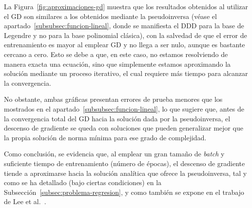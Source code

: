 La Figura~\ref{fig:aproximaciones-gd} muestra que los resultados obtenidos al utilizar el GD son similares a los obtenidos mediante la pseudoinversa (véase el apartado~\ref{subsubsec:funcion-lineal}, donde se manifiesta el DDD para la base de Legendre y no para la base polinomial clásica), con la salvedad de que el error de entrenamiento es mayor al emplear GD y no llega a ser nulo, aunque es bastante cercano a cero. Esto se debe a que, en este caso, no estamos resolviendo de manera exacta una ecuación, sino que simplemente estamos aproximando la solución mediante un proceso iterativo, el cual requiere más tiempo para alcanzar la convergencia.

No obstante, ambas gráficas presentan errores de prueba menores que los mostrados en el apartado~\ref{subsubsec:funcion-lineal}, lo que sugiere que, antes de la convergencia total del GD hacia la solución dada por la pseudoinversa, el descenso de gradiente se queda con soluciones que pueden generalizar mejor que la propia solución de norma mínima para ese grado de complejidad.

Como conclusión, se evidencia que, al emplear un gran tamaño de \textit{batch} y suficiente tiempo de entrenamiento (número de épocas), el descenso de gradiente tiende a aproximarse hacia la solución analítica que ofrece la pseudoinversa, tal y como se ha detallado (bajo ciertas condiciones) en la Subsección~\ref{subsec:problema-regresion}, y como también se expone en el trabajo de Lee et al.~\cite{Lee2016}.

\endinput
